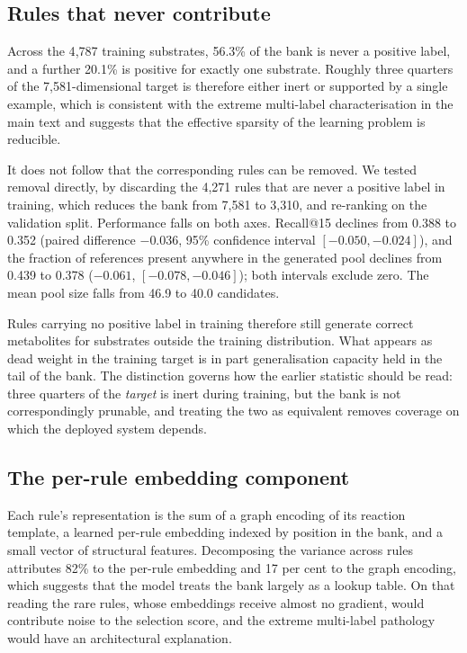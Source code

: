 \subsection{Rules that never contribute}

Across the 4{,}787 training substrates, 56.3\% of the bank is never a positive label, and a
further 20.1\% is positive for exactly one substrate. Roughly three quarters of the
7{,}581-dimensional target is therefore either inert or supported by a single example, which is
consistent with the extreme multi-label characterisation in the main text and suggests that the
effective sparsity of the learning problem is reducible.

It does not follow that the corresponding rules can be removed. We tested removal directly, by
discarding the 4{,}271 rules that are never a positive label in training, which reduces the bank
from 7{,}581 to 3{,}310, and re-ranking on the validation split. Performance falls on both axes.
Recall@15 declines from 0.388 to 0.352 (paired difference $-0.036$, 95\% confidence
interval $[-0.050,-0.024]$), and the fraction of references present anywhere in the generated pool
declines from 0.439 to 0.378 ($-0.061$, $[-0.078,-0.046]$); both intervals exclude zero. The mean
pool size falls from 46.9 to 40.0 candidates.

Rules carrying no positive label in training therefore still generate correct metabolites for
substrates outside the training distribution. What appears as dead weight in the training target
is in part generalisation capacity held in the tail of the bank. The distinction governs how the
earlier statistic should be read: three quarters of the \emph{target} is inert during training,
but the bank is not correspondingly prunable, and treating the two as equivalent removes coverage
on which the deployed system depends.

\subsection{The per-rule embedding component}

Each rule's representation is the sum of a graph encoding of its reaction template, a learned
per-rule embedding indexed by position in the bank, and a small vector of structural features.
Decomposing the variance across rules attributes 82\% to the per-rule embedding and 17 per
cent to the graph encoding, which suggests that the model treats the bank largely as a lookup
table. On that reading the rare rules, whose embeddings receive almost no gradient, would
contribute noise to the selection score, and the extreme multi-label pathology would have an
architectural explanation.


